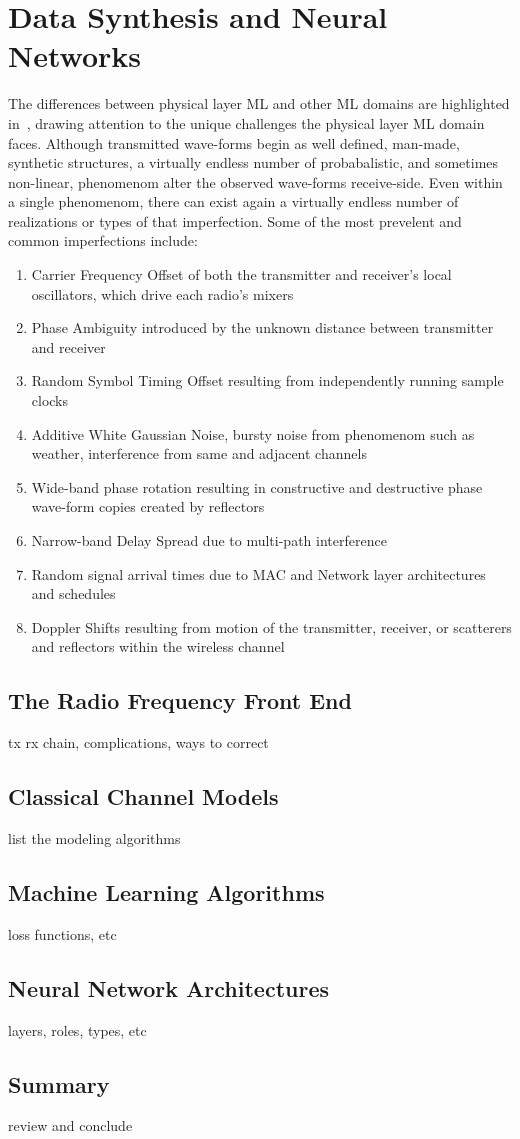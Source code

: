 \chapter{Data Synthesis and Neural Networks}
\label{chapter2}
The differences between physical layer ML and other ML domains are highlighted in~\cite{o2016radio}, drawing attention to the unique challenges the physical layer ML domain faces. Although transmitted wave-forms begin as well defined, man-made, synthetic structures, a virtually endless number of probabalistic, and sometimes non-linear, phenomenom alter the observed wave-forms receive-side. Even within a single phenomenom, there can exist again a virtually endless number of realizations or types of that imperfection. Some of the most prevelent and common imperfections include:
\begin{enumerate}
	\item Carrier Frequency Offset of both the transmitter and receiver's local oscillators, which drive each radio's mixers
	\item Phase Ambiguity introduced by the unknown distance between transmitter and receiver
	\item Random Symbol Timing Offset resulting from independently running sample clocks
	\item Additive White Gaussian Noise, bursty noise from phenomenom such as weather, interference from same and adjacent channels
	\item Wide-band phase rotation resulting in constructive and destructive phase wave-form copies created by reflectors
	\item Narrow-band Delay Spread due to multi-path interference
	\item Random signal arrival times due to MAC and Network layer architectures and schedules
	\item Doppler Shifts resulting from motion of the transmitter, receiver, or scatterers and reflectors within the wireless channel
\end{enumerate}

\section{The Radio Frequency Front End}
tx rx chain, complications, ways to correct

\section{Classical Channel Models}
list the modeling algorithms

\section{Machine Learning Algorithms}
loss functions, etc

\section{Neural Network Architectures}
layers, roles, types, etc


\section{Summary}
review and conclude\\

